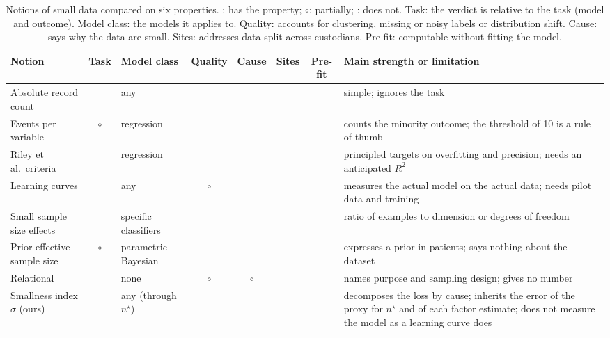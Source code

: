 \documentclass[acmsmall,screen,review]{acmart}
\newcommand{\yes}{\textcolor{famC}{\ding{51}}}
\newcommand{\no}{\textcolor{famO}{\ding{55}}}
\newcommand{\partly}{\textcolor{famT}{$\boldsymbol{\circ}$}}
\theoremstyle{acmdefinition}
\begin{document}
\begin{table}[!tp]
\caption{Notions of small data compared on six properties. \yes: has the property; \partly: partially; \no: does not. Task: the verdict is relative to the task (model and outcome). Model class: the models it applies to. Quality: accounts for clustering, missing or noisy labels or distribution shift. Cause: says why the data are small. Sites: addresses data split across custodians. Pre-fit: computable without fitting the model.}
\label{tab:notions}
\footnotesize
\setlength{\tabcolsep}{3.5pt}
\begin{tabularx}{\linewidth}{@{}p{3.3cm}cp{1.75cm}ccccX@{}}
\toprule
Notion & Task & Model class & Quality & Cause & Sites & Pre-fit & Main strength or limitation\\
\midrule
Absolute record count & \no & any & \no & \no & \no & \yes & simple; ignores the task\\
Events per variable \cite{peduzzi1996simulation} & \partly & regression & \no & \no & \no & \yes & counts the minority outcome; the threshold of 10 is a rule of thumb \cite{smeden2019sample}\\
Riley et al.\ criteria \cite{riley2019minimumsample} & \yes & regression & \no & \no & \no & \yes & principled targets on overfitting and precision; needs an anticipated $R^2$\\
Learning curves \cite{figueroa2012predicting,balki2019sample} & \yes & any & \partly & \no & \no & \no & measures the actual model on the actual data; needs pilot data and training\\
Small sample size effects \cite{raudys1991small,zhang2018strategy} & \yes & specific classifiers & \no & \no & \no & \yes & ratio of examples to dimension or degrees of freedom\\
Prior effective sample size \cite{morita2008determining} & \partly & parametric Bayesian & \no & \no & \no & \yes & expresses a prior in patients; says nothing about the dataset\\
Relational \cite{kitchin2015small,hekler2019we} & \no & none & \partly & \partly & \no & \yes & names purpose and sampling design; gives no number\\
Smallness index $\sigma$ (ours) & \yes & any (through $n^{\star}$) & \yes & \yes & \yes & \yes & decomposes the loss by cause; inherits the error of the proxy for $n^{\star}$ and of each factor estimate; does not measure the model as a learning curve does\\
\bottomrule
\end{tabularx}
\end{table}
\end{document}
